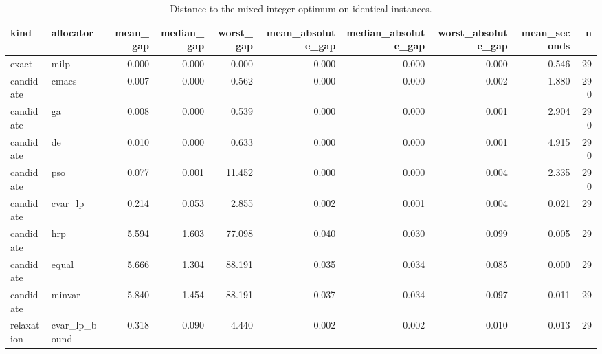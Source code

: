 \begin{table}
\caption{Distance to the mixed-integer optimum on identical instances.}
\label{tab:optimality_gaps}
\begin{tabular}{llrrrrrrrr}
\toprule
kind & allocator & mean\_gap & median\_gap & worst\_gap & mean\_absolute\_gap & median\_absolute\_gap & worst\_absolute\_gap & mean\_seconds & n \\
\midrule
exact & milp & 0.000 & 0.000 & 0.000 & 0.000 & 0.000 & 0.000 & 0.546 & 29 \\
candidate & cmaes & 0.007 & 0.000 & 0.562 & 0.000 & 0.000 & 0.002 & 1.880 & 290 \\
candidate & ga & 0.008 & 0.000 & 0.539 & 0.000 & 0.000 & 0.001 & 2.904 & 290 \\
candidate & de & 0.010 & 0.000 & 0.633 & 0.000 & 0.000 & 0.001 & 4.915 & 290 \\
candidate & pso & 0.077 & 0.001 & 11.452 & 0.000 & 0.000 & 0.004 & 2.335 & 290 \\
candidate & cvar\_lp & 0.214 & 0.053 & 2.855 & 0.002 & 0.001 & 0.004 & 0.021 & 29 \\
candidate & hrp & 5.594 & 1.603 & 77.098 & 0.040 & 0.030 & 0.099 & 0.005 & 29 \\
candidate & equal & 5.666 & 1.304 & 88.191 & 0.035 & 0.034 & 0.085 & 0.000 & 29 \\
candidate & minvar & 5.840 & 1.454 & 88.191 & 0.037 & 0.034 & 0.097 & 0.011 & 29 \\
relaxation & cvar\_lp\_bound & 0.318 & 0.090 & 4.440 & 0.002 & 0.002 & 0.010 & 0.013 & 29 \\
\bottomrule
\end{tabular}
\end{table}
